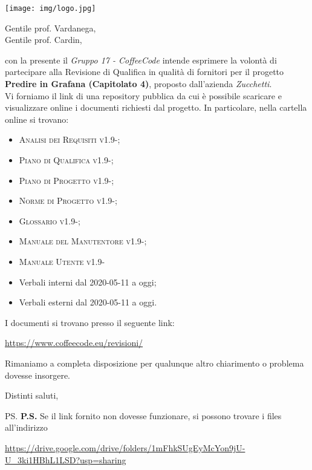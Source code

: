 \documentclass{letter}
\date{11 Giugno 2020}
\begin{document}
\begin{letter}{ }

\texttt{[image: img/logo.jpg]}

\opening{Gentile prof. Vardanega, \\
Gentile prof. Cardin,}

con la presente il \textit{Gruppo 17 - CoffeeCode} intende esprimere la volontà di partecipare alla Revisione di Qualifica in qualità di fornitori per il progetto 
\textbf{Predire in Grafana (Capitolato 4)}, proposto dall'azienda \textit{Zucchetti}. \\
Vi forniamo il link di una repository pubblica da cui è possibile scaricare e visualizzare online i documenti richiesti dal progetto. In particolare, nella cartella online si trovano:
\begin{itemize}
  \item \textsc{Analisi dei Requisiti v1.9-};
  \item \textsc{Piano di Qualifica v1.9-};
  \item \textsc{Piano di Progetto v1.9-};
  \item \textsc{Norme di Progetto v1.9-};
  \item \textsc{Glossario v1.9-};
  \item \textsc{Manuale del Manutentore v1.9-};
  \item \textsc{Manuale Utente v1.9-}
  \item Verbali interni dal 2020-05-11 a oggi;
  \item Verbali esterni dal 2020-05-11 a oggi.
\end{itemize}
\newpage
I documenti si trovano presso il seguente link:
\begin{center}
  \centering
  \href{https://www.coffeecode.eu/revisioni/}{https://www.coffeecode.eu/revisioni/}
\end{center}


Rimaniamo a completa disposizione per qualunque altro chiarimento o problema dovesse insorgere.

\closing{Distinti saluti,}

\ps
\textbf{P.S.} Se il link fornito non dovesse funzionare, si possono trovare i files all'indirizzo
\begin{center}
	
	\href{https://drive.google.com/drive/folders/1mFhkSUgEyMcYon9jU-U_3ki1HBhL1LSD?usp=sharing}{https://drive.google.com/drive/folders/1mFhkSUgEyMcYon9jU-U\_3ki1HBhL1LSD?usp=sharing}
\end{center}

\end{letter}
\end{document}
